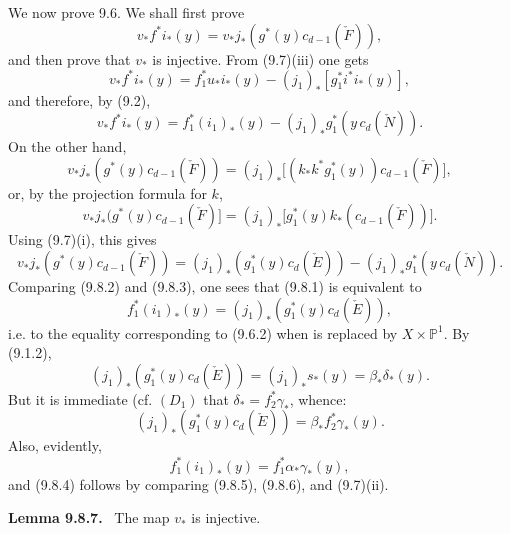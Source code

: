\documentclass[11pt]{article}
\newenvironment{statement}[1]{\par\medskip\noindent\textbf{#1.}\ }{\par\medskip}
\begin{document}
We now prove 9.6. We shall first prove
\[
v_*f^*i_*(y)=v_*j_*(g^*(y)c_{d-1}(\check F)),
\tag{9.8.1}
\]
and then prove that $v_*$ is injective. From (9.7)(iii) one gets
\[
v_*f^*i_*(y)=f_1^*u_*i_*(y)-(j_1)_*[g_1^*i^*i_*(y)],
\]
and therefore, by (9.2),
\[
v_*f^*i_*(y)=f_1^*(i_1)_*(y)-(j_1)_*g_1^*(y\,c_d(\check N)).
\tag{9.8.2}
\]
On the other hand,
\[
v_*j_*(g^*(y)c_{d-1}(\check F))
=(j_1)_*\bigl[(k_*k^*g_1^*(y))c_{d-1}(\check F)\bigr],
\]
or, by the projection formula for $k$,
\[
v_*j_*(g^*(y)c_{d-1}(\check F)]
=(j_1)_*\bigl[g_1^*(y)k_*(c_{d-1}(\check F))\bigr].
\]
Using (9.7)(i), this gives
\[
v_*j_*(g^*(y)c_{d-1}(\check F))
=(j_1)_*(g_1^*(y)c_d(\check E))-(j_1)_*g_1^*(y\,c_d(\check N)).
\tag{9.8.3}
\]
Comparing (9.8.2) and (9.8.3), one sees that (9.8.1) is equivalent to
\[
f_1^*(i_1)_*(y)=(j_1)_*(g_1^*(y)c_d(\check E)),
\tag{9.8.4}
\]
i.e. to the equality corresponding to (9.6.2) when is replaced by $X\times\mathbb P^1$. By (9.1.2),
\[
(j_1)_*(g_1^*(y)c_d(\check E))=(j_1)_*s_*(y)=\beta_*\delta_*(y).
\]
But it is immediate (cf. $(D_1)$ that $\delta_*=f_2^*\gamma_*$, whence:
\[
(j_1)_*(g_1^*(y)c_d(\check E))=\beta_*f_2^*\gamma_*(y).
\tag{9.8.5}
\]
Also, evidently,
\[
f_1^*(i_1)_*(y)=f_1^*\alpha_*\gamma_*(y),
\tag{9.8.6}
\]
and (9.8.4) follows by comparing (9.8.5), (9.8.6), and (9.7)(ii).

\begin{statement}{Lemma 9.8.7}
The map $v_*$ is injective.
\end{statement}
\end{document}

